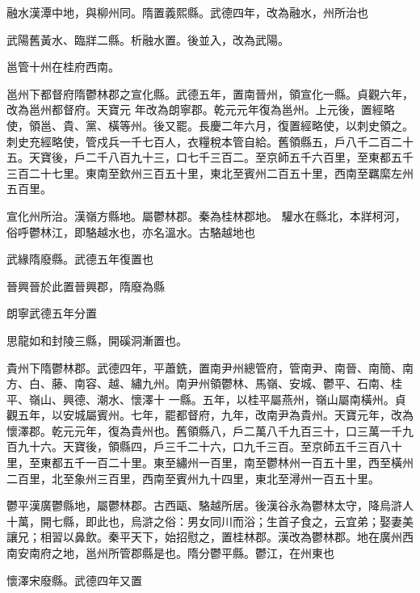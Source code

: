 \begin{pinyinscope}
 融水漢潭中地，與柳州同。隋置義熙縣。武德四年，改為融水，州所治也



 武陽舊黃水、臨牂二縣。析融水置。後並入，改為武陽。



 邕管十州在桂府西南。



 邕州下都督府隋鬱林郡之宣化縣。武德五年，置南晉州，領宣化一縣。貞觀六年，改為邕州都督府。天寶元
 年改為朗寧郡。乾元元年復為邕州。上元後，置經略使，領邕、貴、黨、橫等州。後又罷。長慶二年六月，復置經略使，以刺史領之。刺史充經略使，管戍兵一千七百人，衣糧稅本管自給。舊領縣五，戶八千二百二十五。天寶後，戶二千八百九十三，口七千三百二。至京師五千六百里，至東都五千三百二十七里。東南至欽州三百五十里，東北至賓州二百五十里，西南至羈縻左州五百里。



 宣化州所治。漢嶺方縣地。屬鬱林郡。秦為桂林郡地。
 驩水在縣北，本牂柯河，俗呼鬱林江，即駱越水也，亦名溫水。古駱越地也



 武緣隋廢縣。武德五年復置也



 晉興晉於此置晉興郡，隋廢為縣



 朗寧武德五年分置



 思龍如和封陵三縣，開磎洞漸置也。



 貴州下隋鬱林郡。武德四年，平蕭銑，置南尹州總管府，管南尹、南晉、南簡、南方、白、藤、南容、越、繡九州。南尹州領鬱林、馬嶺、安城、鬱平、石南、桂平、嶺山、興德、潮水、懷澤十
 一縣。五年，以桂平屬燕州，嶺山屬南橫州。貞觀五年，以安城屬賓州。七年，罷都督府，九年，改南尹為貴州。天寶元年，改為懷澤郡。乾元元年，復為貴州也。舊領縣八，戶二萬八千九百三十，口三萬一千九百九十六。天寶後，領縣四，戶三千二十六，口九千三百。至京師五千三百八十里，至東都五千一百二十里。東至繡州一百里，南至鬱林州一百五十里，西至橫州二百里，北至象州三百里，西南至賓州九十四里，東北至潯州一百五十里。



 鬱平漢廣鬱縣地，屬鬱林郡。古西甌、駱越所居。後漢谷永為鬱林太守，降烏滸人十萬，開七縣，即此也，烏滸之俗：男女同川而浴；生首子食之，云宜弟；娶妻美讓兄；相習以鼻飲。秦平天下，始招慰之，置桂林郡。漢改為鬱林郡。地在廣州西南安南府之地，邕州所管郡縣是也。隋分鬱平縣。鬱江，在州東也



 懷澤宋廢縣。武德四年又置




\end{pinyinscope}
